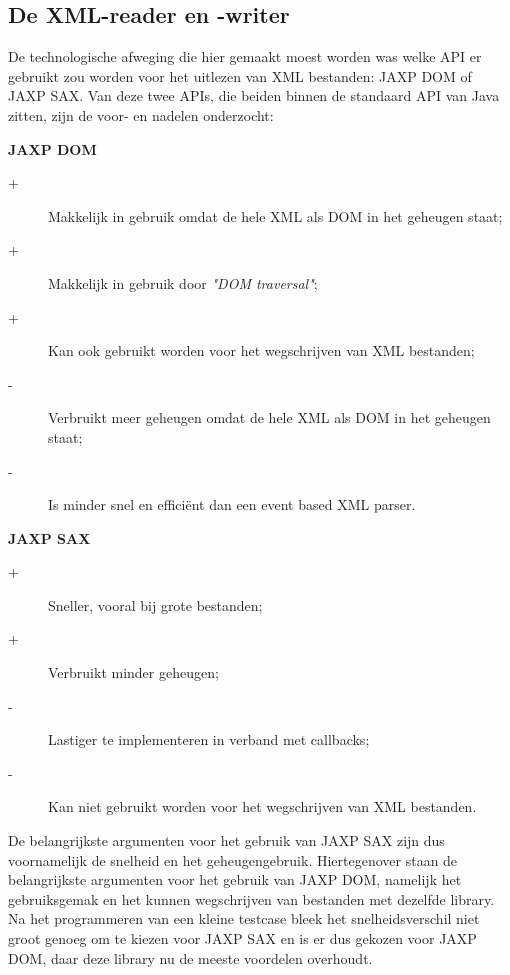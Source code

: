 \documentclass[a4paper,11pt]{article}
\begin{document}
\subsection{De XML-reader en -writer}
De technologische afweging die hier gemaakt moest worden was welke API er gebruikt zou worden voor het uitlezen van XML bestanden: JAXP DOM of JAXP SAX. Van deze twee APIs, die beiden binnen de standaard API van Java zitten, zijn de voor- en nadelen onderzocht:
\begin{description}
	\item \textbf{JAXP DOM}
		\begin{description}
			\item[+] Makkelijk in gebruik omdat de hele XML als DOM in het geheugen staat;
			\item[+] Makkelijk in gebruik door \textit{"DOM traversal"};
			\item[+] Kan ook gebruikt worden voor het wegschrijven van XML bestanden;
			\item[-] Verbruikt meer geheugen omdat de hele XML als DOM in het geheugen staat;
			\item[-] Is minder snel en efficiënt dan een event based XML parser.
		\end{description}
	\item \textbf{JAXP SAX}
		\begin{description}
			\item[+] Sneller, vooral bij grote bestanden;
			\item[+] Verbruikt minder geheugen;
			\item[-] Lastiger te implementeren in verband met callbacks;
			\item[-] Kan niet gebruikt worden voor het wegschrijven van XML bestanden.
		\end{description}
\end{description}

De belangrijkste argumenten voor het gebruik van JAXP SAX zijn dus voornamelijk de snelheid en het geheugengebruik. Hiertegenover staan de belangrijkste argumenten voor het gebruik van JAXP DOM, namelijk het gebruiksgemak en het kunnen wegschrijven van bestanden met dezelfde library. Na het programmeren van een kleine testcase bleek het snelheidsverschil niet groot genoeg om te kiezen voor JAXP SAX en is er dus gekozen voor JAXP DOM, daar deze library nu de meeste voordelen overhoudt.
\end{document}
